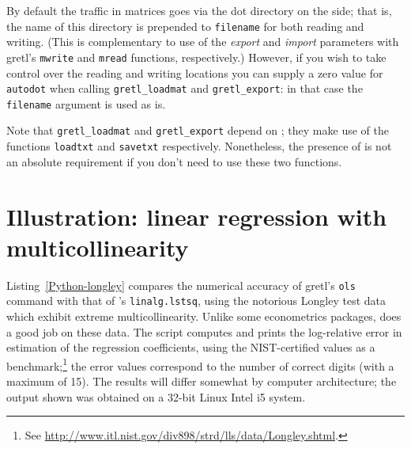 By default the traffic in matrices goes via the dot directory on the
 side; that is, the name of this directory is prepended to
\texttt{filename} for both reading and writing. (This is complementary
to use of the \textsl{export} and \textsl{import} parameters with
gretl's \texttt{mwrite} and \texttt{mread} functions,
respectively.) However, if you wish to take control over the reading
and writing locations you can supply a zero value for
\texttt{autodot} when calling \verb|gretl_loadmat| and
\verb|gretl_export|: in that case the \texttt{filename} argument is
used as is.

Note that \verb|gretl_loadmat| and \verb|gretl_export| depend on
; they make use of the functions \texttt{loadtxt} and
\texttt{savetxt} respectively. Nonetheless, the presence of
 is not an absolute requirement if you don't need
to use these two functions.

\section{Illustration: linear regression with multicollinearity}
\label{sec:Python-longley}

Listing~\ref{Python-longley} compares the numerical accuracy of
gretl's \texttt{ols} command with that of 's
\texttt{linalg.lstsq}, using the notorious Longley test data which
exhibit extreme multicollinearity.  Unlike some econometrics packages,
 does a good job on these data. The script computes and
prints the log-relative error in estimation of the regression
coefficients, using the NIST-certified values as a
benchmark;\footnote{See
  \url{http://www.itl.nist.gov/div898/strd/lls/data/Longley.shtml}.}
the error values correspond to the number of correct digits (with a
maximum of 15). The results will differ somewhat by computer
architecture; the output shown was obtained on a 32-bit Linux Intel i5
system.

